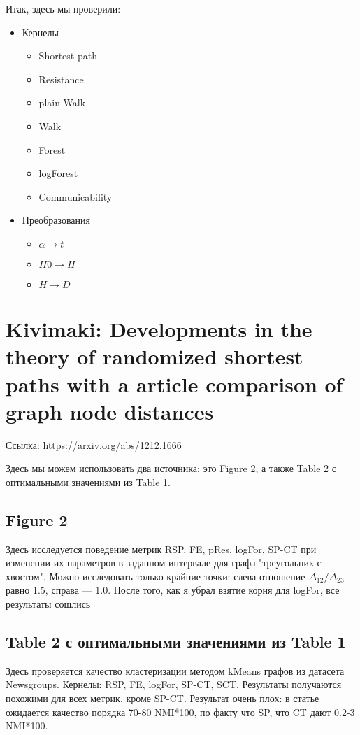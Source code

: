 \documentclass{article}
\begin{document}
Итак, здесь мы проверили:
\begin{itemize}
  \item Кернелы
  \begin{itemize}
    \item Shortest path
    \item Resistance
    \item plain Walk
    \item Walk
    \item Forest
    \item logForest
    \item Communicability
  \end{itemize}
  \item Преобразования
  \begin{itemize}
    \item $\alpha \rightarrow t$
    \item $H0 \rightarrow H$
    \item $H \rightarrow D$
   \end{itemize}
\end{itemize}


\section{Kivimaki: Developments in the theory of randomized shortest paths with a article comparison of graph node distances}
Ссылка: \url{https://arxiv.org/abs/1212.1666}

Здесь мы можем использовать два источника: это Figure 2, а также Table 2 с оптимальными значениями из Table 1.

\subsection{Figure 2}
Здесь исследуется поведение метрик RSP, FE, pRes, logFor, SP-CT при изменении их параметров в заданном интервале для графа "треугольник с хвостом". Можно исследовать только крайние точки: слева отношение $\Delta_{12}/\Delta_{23}$ равно 1.5, справа --- 1.0.
После того, как я убрал взятие корня для logFor, все результаты сошлись

\subsection{Table 2 с оптимальными значениями из Table 1}
Здесь проверяется качество кластеризации методом kMeans графов из датасета Newsgroups. Кернелы: RSP, FE, logFor, SP-CT, SCT. Результаты получаются похожими для всех метрик, кроме SP-CT. Результат очень плох: в статье ожидается качество порядка 70-80 NMI*100, по факту что SP, что CT дают 0.2-3 NMI*100.
\end{document}
